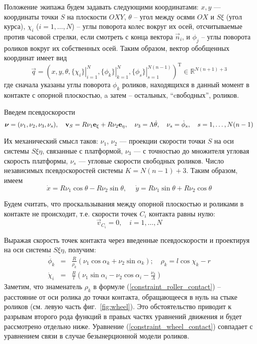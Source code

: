 Положение экипажа будем задавать следующими координатами:
$x, y$ --- координаты точки $S$ на плоскости $OXY$, $\theta$ -- угол между осями $OX$ и $S\xi$ (угол курса),
$\chi_i$ ($i = 1,\dots,N$) -- углы поворота колес вокруг их осей, отсчитываемые против часовой стрелки, если смотреть с конца вектора $\vec{n}_i$, и $\phi_j$ -- углы поворота роликов вокруг их собственных осей.
Таким образом, вектор обобщенных координат имеет вид
$$\vec{q} = (
    x, y, \theta,
    \left.\{\chi_i\}\right|_{i=1}^N ,
    \left.\{\phi_k\}\right|_{k=1}^N,
    \left.\{\phi_s\}\right|_{s=1}^{N(n - 1)}
)^{\mathop{T}}\in\mathbb{R}^{N(n+1) + 3}$$ 
где сначала указаны углы поворота $\phi_k$ роликов, находящихся в данный момент в контакте с опорной плоскостью, a затем -- остальных, ``cвободных'', роликов.

Введем псевдоскорости
$$\boldsymbol{\mathbf{\nu}} = (\nu_1, \nu_2, \nu_3, \nu_s), \quad \boldsymbol{\mathbf{v}}_S = R\nu_1\boldsymbol{\mathbf{e}}_\xi + R\nu_2\boldsymbol{\mathbf{e}}_\eta, \quad \nu_3 = \Lambda\dot{\theta},\quad \nu_s = \dot{\phi}_s, \quad s = 1,\ldots,N(n-1)$$

Их механический смысл таков: $\nu_1$, $\nu_2$ --- проекции скорости точки $S$ на оси системы $S\xi\eta$, связанные с платформой, $\nu_3$ --- с точностью до множителя угловая скорость платформы, $\nu_s$ --- угловые скорости свободных роликов. Число независимых псевдоскоростей системы $K = N(n-1)+3$. Таким образом, имеем
$$ \dot{x} = R \nu_1\cos\theta-R\nu_2\sin\theta, \hspace{15pt} \dot{y} = R\nu_1\sin\theta+R\nu_2\cos\theta$$

Будем считать, что проскальзывания между опорной плоскостью и роликами в контакте не происходит, т.е.
скорости точек $C_i$ контакта равны нулю:
\begin{equation}\label{eq:constraints_vec}
    \vec{v}_{C_i} = 0,\quad i = 1,\dots, N    
\end{equation}

Выражая скорость точек контакта через введенные псевдоскорости и проектируя на оси системы $S\xi\eta$, получим:
\begin{eqnarray}
\dot{\phi_k} &=& \frac{R}{\rho_k }(\nu_1\cos\alpha_k + \nu_2\sin\alpha_k); \quad \rho_k  = l\cos\chi_k - r \label{constraint_roller_contact}\\
\dot{\chi}_i &=& \frac{R}{l}(\nu_1\sin\alpha_i - \nu_2\cos\alpha_i - \frac{\nu_3}{\Lambda})\label{constraint_wheel_contact}
\end{eqnarray}
Заметим, что знаменатель $\rho_k$ в формуле (\ref{constraint_roller_contact}) -- расстояние от оси ролика до точки контакта, обращающееся в нуль на стыке роликов (см. левую часть фиг.~\ref{fig:wheel}). Это обстоятельство приводит к разрывам второго рода функций в правых частях уравнений движения и будет рассмотрено отдельно ниже.
Уравнение (\ref{constraint_wheel_contact}) совпадает с уравнением связи в случае безынерционной модели роликов. 


